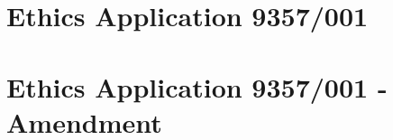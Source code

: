 
\chapter{Ethics Application 9357/001}
\label{app:ethics3}

\label{app:ethics1}

\chapter{Ethics Application 9357/001 - Amendment}
\label{app:ethics2}



